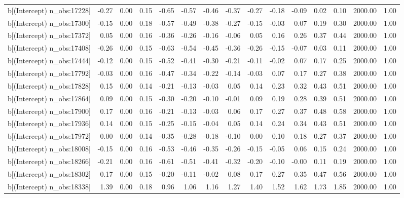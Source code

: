 \begin{table}[ht]
\begin{tabular}{rrrrrrrrrrrrrrr}
  b[(Intercept) n\_obs:17228] & -0.27 & 0.00 & 0.15 & -0.65 & -0.57 & -0.46 & -0.37 & -0.27 & -0.18 & -0.09 & 0.02 & 0.10 & 2000.00 & 1.00 \\ 
  b[(Intercept) n\_obs:17300] & -0.15 & 0.00 & 0.18 & -0.57 & -0.49 & -0.38 & -0.27 & -0.15 & -0.03 & 0.07 & 0.19 & 0.30 & 2000.00 & 1.00 \\ 
  b[(Intercept) n\_obs:17372] & 0.05 & 0.00 & 0.16 & -0.36 & -0.26 & -0.16 & -0.06 & 0.05 & 0.16 & 0.26 & 0.37 & 0.44 & 2000.00 & 1.00 \\ 
  b[(Intercept) n\_obs:17408] & -0.26 & 0.00 & 0.15 & -0.63 & -0.54 & -0.45 & -0.36 & -0.26 & -0.15 & -0.07 & 0.03 & 0.11 & 2000.00 & 1.00 \\ 
  b[(Intercept) n\_obs:17444] & -0.12 & 0.00 & 0.15 & -0.52 & -0.41 & -0.30 & -0.21 & -0.11 & -0.02 & 0.07 & 0.17 & 0.25 & 2000.00 & 1.00 \\ 
  b[(Intercept) n\_obs:17792] & -0.03 & 0.00 & 0.16 & -0.47 & -0.34 & -0.22 & -0.14 & -0.03 & 0.07 & 0.17 & 0.27 & 0.38 & 2000.00 & 1.00 \\ 
  b[(Intercept) n\_obs:17828] & 0.15 & 0.00 & 0.14 & -0.21 & -0.13 & -0.03 & 0.05 & 0.14 & 0.23 & 0.32 & 0.43 & 0.51 & 2000.00 & 1.00 \\ 
  b[(Intercept) n\_obs:17864] & 0.09 & 0.00 & 0.15 & -0.30 & -0.20 & -0.10 & -0.01 & 0.09 & 0.19 & 0.28 & 0.39 & 0.51 & 2000.00 & 1.00 \\ 
  b[(Intercept) n\_obs:17900] & 0.17 & 0.00 & 0.16 & -0.21 & -0.13 & -0.03 & 0.06 & 0.17 & 0.27 & 0.37 & 0.48 & 0.58 & 2000.00 & 1.00 \\ 
  b[(Intercept) n\_obs:17936] & 0.14 & 0.00 & 0.15 & -0.25 & -0.15 & -0.04 & 0.05 & 0.14 & 0.24 & 0.34 & 0.43 & 0.51 & 2000.00 & 1.00 \\ 
  b[(Intercept) n\_obs:17972] & 0.00 & 0.00 & 0.14 & -0.35 & -0.28 & -0.18 & -0.10 & 0.00 & 0.10 & 0.18 & 0.27 & 0.37 & 2000.00 & 1.00 \\ 
  b[(Intercept) n\_obs:18008] & -0.15 & 0.00 & 0.16 & -0.53 & -0.46 & -0.35 & -0.26 & -0.15 & -0.05 & 0.06 & 0.15 & 0.24 & 2000.00 & 1.00 \\ 
  b[(Intercept) n\_obs:18266] & -0.21 & 0.00 & 0.16 & -0.61 & -0.51 & -0.41 & -0.32 & -0.20 & -0.10 & -0.00 & 0.11 & 0.19 & 2000.00 & 1.00 \\ 
  b[(Intercept) n\_obs:18302] & 0.17 & 0.00 & 0.15 & -0.20 & -0.11 & -0.02 & 0.08 & 0.17 & 0.27 & 0.35 & 0.47 & 0.56 & 2000.00 & 1.00 \\ 
  b[(Intercept) n\_obs:18338] & 1.39 & 0.00 & 0.18 & 0.96 & 1.06 & 1.16 & 1.27 & 1.40 & 1.52 & 1.62 & 1.73 & 1.85 & 2000.00 & 1.00 \\ 

\end{tabular}
\end{table}

